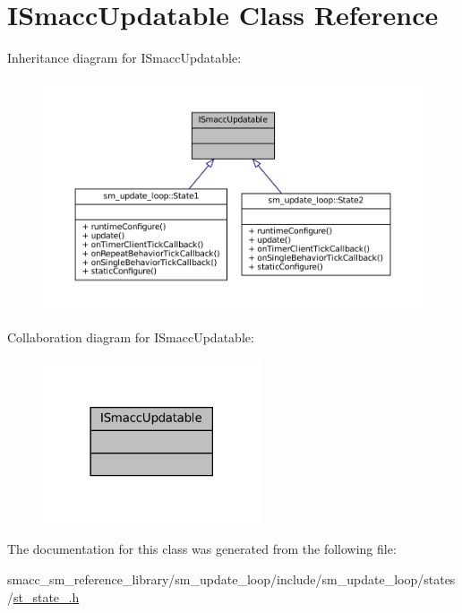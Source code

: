 \hypertarget{classISmaccUpdatable}{}\section{I\+Smacc\+Updatable Class Reference}
\label{classISmaccUpdatable}


Inheritance diagram for I\+Smacc\+Updatable\+:
\nopagebreak
\begin{figure}[H]
\begin{center}
\leavevmode
\includegraphics[width=350pt]{classISmaccUpdatable__inherit__graph}
\end{center}
\end{figure}


Collaboration diagram for I\+Smacc\+Updatable\+:
\nopagebreak
\begin{figure}[H]
\begin{center}
\leavevmode
\includegraphics[width=182pt]{classISmaccUpdatable__coll__graph}
\end{center}
\end{figure}


The documentation for this class was generated from the following file\+:\begin{DoxyCompactItemize}
\item 
smacc\+\_\+sm\+\_\+reference\+\_\+library/sm\+\_\+update\+\_\+loop/include/sm\+\_\+update\+\_\+loop/states/\hyperlink{smacc__sm__reference__library_2sm__update__loop_2include_2sm__update__loop_2states_2st__state__1_8h}{st\+\_\+state\+\_.\+h}\end{DoxyCompactItemize}
